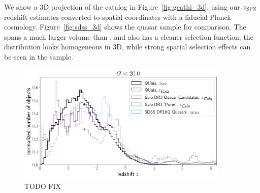 We show a 3D projection of the \cat catalog in Figure~\ref{fig:gcathi_3d}, using our $z_\mathrm{SPZ}$ redshift estimates converted to spatial coordinates with a fiducial Planck cosmology.
Figure~\ref{fig:sdss_3d} shows the \SDSS quasar sample for comparison.
The \catalog spans a much larger volume than \SDSS, and also has a cleaner selection function; the distribution looks homogeneous in 3D, while strong spatial selection effects can be seen in the \SDSS sample.

\begin{figure}
    \centering
    \includegraphics[width=0.9\textwidth]{redshift_dists_Glo.png}
    \caption{TODO FIX}
    \label{fig:z_dists}
\end{figure}

